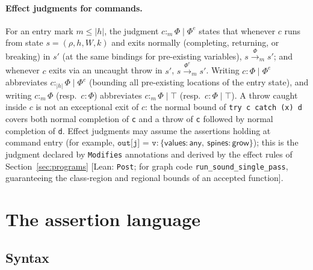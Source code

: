 \documentclass[10pt,a4paper]{article}
\theoremstyle{definition}
\theoremstyle{remark}
\newcommand{\kw}[1]{\mathsf{#1}}
\newcommand{\grow}{\kw{grow}}
\newcommand{\any}{\kw{any}}
\newcommand{\val}{\kw{values}}
\newcommand{\st}{\kw{spines}}
\newcommand{\len}[1]{|#1|}
\newcommand{\tr}[1]{\xrightarrow{#1}}
\newcommand{\code}[1]{\texttt{#1}}
\newcommand{\lean}[1]{\texttt{\small #1}}
\newcommand{\status}[1]{\textsf{\small[#1]}}
\begin{document}
\paragraph{Effect judgments for commands.}
For an entry mark $m\le\len h$, the judgment $c:_{m}\Phi\mid\Phi^{e}$
states that whenever $c$ runs from state $s=(\rho,h,W,k)$ and exits
normally (completing, returning, or breaking) in $s'$ (at the same
bindings for pre-existing variables), $s\tr{\Phi}_m s'$; and whenever $c$
exits via an uncaught throw in $s'$, $s\tr{\Phi^{e}}_m s'$. Writing
$c:\Phi\mid\Phi^{e}$ abbreviates $c:_{\len h}\Phi\mid\Phi^{e}$ (bounding
all pre-existing locations of the entry state), and writing $c:_{m}\Phi$
(resp.\ $c:\Phi$) abbreviates $c:_{m}\Phi\mid\top$ (resp.\ $c:\Phi\mid\top$).
A throw caught inside $c$ is not an exceptional exit of
$c$: the normal bound of \code{try c catch (x) d} covers both normal
completion of \code{c} and a throw of \code{c} followed by normal
completion of \code{d}. Effect judgments may assume the assertions
holding at command entry (for example,
$\code{out[j] = v}:\{\val:\any,\ \st:\grow\}$); this is the judgment
declared by \code{Modifies} annotations and derived by the effect rules
of Section~\ref{sec:programs}
\status{Lean: \lean{Post}; for graph code \lean{run\_sound\_single\_pass}, guaranteeing the class-region and regional bounds of an accepted function}.

\section{The assertion language}\label{sec:assertions}

\subsection{Syntax}
\end{document}
